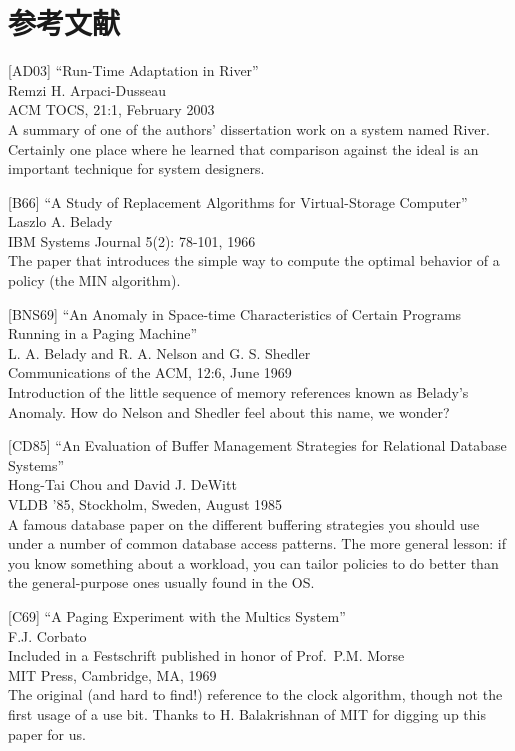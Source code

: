\hypertarget{ux53c2ux8003ux6587ux732e-14}{%
\section*{参考文献}\label{ux53c2ux8003ux6587ux732e-14}}

{[}AD03{]} ``Run-Time Adaptation in River''\\
Remzi H. Arpaci-Dusseau\\
ACM TOCS, 21:1, February 2003\\
A summary of one of the authors' dissertation work on a system named
River. Certainly one place where he learned that comparison against the
ideal is an important technique for system designers.

{[}B66{]} ``A Study of Replacement Algorithms for Virtual-Storage
Computer''\\
Laszlo A. Belady\\
IBM Systems Journal 5(2): 78-101, 1966\\
The paper that introduces the simple way to compute the optimal behavior
of a policy (the MIN algorithm).

{[}BNS69{]} ``An Anomaly in Space-time Characteristics of Certain
Programs Running in a Paging Machine''\\
L. A. Belady and R. A. Nelson and G. S. Shedler\\
Communications of the ACM, 12:6, June 1969\\
Introduction of the little sequence of memory references known as
Belady's Anomaly. How do Nelson and Shedler feel about this name, we
wonder?

{[}CD85{]} ``An Evaluation of Buffer Management Strategies for
Relational Database Systems''\\
Hong-Tai Chou and David J. DeWitt\\
VLDB '85, Stockholm, Sweden, August 1985\\
A famous database paper on the different buffering strategies you should
use under a number of common database access patterns. The more general
lesson: if you know something about a workload, you can tailor policies
to do better than the general-purpose ones usually found in the OS.

{[}C69{]} ``A Paging Experiment with the Multics System''\\
F.J. Corbato\\
Included in a Festschrift published in honor of Prof.~P.M. Morse\\
MIT Press, Cambridge, MA, 1969\\
The original (and hard to find!) reference to the clock algorithm,
though not the first usage of a use bit. Thanks to H. Balakrishnan of
MIT for digging up this paper for us.

